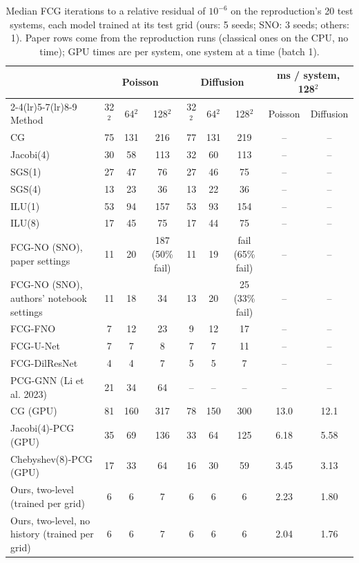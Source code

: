 \begin{table}[t]
\centering
\footnotesize
\caption{Median FCG iterations to a relative residual of $10^{-6}$ on the reproduction's 20 test systems, each model trained at its test grid (ours: 5 seeds; SNO: 3 seeds; others: 1). Paper rows come from the reproduction runs (classical ones on the CPU, no time); GPU times are per system, one system at a time (batch 1).}
\label{tab:unified}
\begin{tabular}{lcccccccc}
\toprule
& \multicolumn{3}{c}{Poisson} & \multicolumn{3}{c}{Diffusion} & \multicolumn{2}{c}{ms / system, 128$^2$} \\
\cmidrule(lr){2-4}\cmidrule(lr){5-7}\cmidrule(lr){8-9}
Method & 32$^2$ & 64$^2$ & 128$^2$ & 32$^2$ & 64$^2$ & 128$^2$ & Poisson & Diffusion \\
\midrule
CG & 75 & 131 & 216 & 77 & 131 & 219 & -- & -- \\
Jacobi(4) & 30 & 58 & 113 & 32 & 60 & 113 & -- & -- \\
SGS(1) & 27 & 47 & 76 & 27 & 46 & 75 & -- & -- \\
SGS(4) & 13 & 23 & 36 & 13 & 22 & 36 & -- & -- \\
ILU(1) & 53 & 94 & 157 & 53 & 93 & 154 & -- & -- \\
ILU(8) & 17 & 45 & 75 & 17 & 44 & 75 & -- & -- \\
FCG-NO (SNO), paper settings & 11 & 20 & 187 (50\% fail) & 11 & 19 & fail (65\% fail) & -- & -- \\
FCG-NO (SNO), authors' notebook settings & 11 & 18 & 34 & 13 & 20 & 25 (33\% fail) & -- & -- \\
FCG-FNO & 7 & 12 & 23 & 9 & 12 & 17 & -- & -- \\
FCG-U-Net & 7 & 7 & 8 & 7 & 7 & 11 & -- & -- \\
FCG-DilResNet & 4 & 4 & 7 & 5 & 5 & 7 & -- & -- \\
PCG-GNN (Li et al. 2023) & 21 & 34 & 64 & -- & -- & -- & -- & -- \\
CG (GPU) & 81 & 160 & 317 & 78 & 150 & 300 & 13.0 & 12.1 \\
Jacobi(4)-PCG (GPU) & 35 & 69 & 136 & 33 & 64 & 125 & 6.18 & 5.58 \\
Chebyshev(8)-PCG (GPU) & 17 & 33 & 64 & 16 & 30 & 59 & 3.45 & 3.13 \\
Ours, two-level (trained per grid) & 6 & 6 & 7 & 6 & 6 & 6 & 2.23 & 1.80 \\
Ours, two-level, no history (trained per grid) & 6 & 6 & 7 & 6 & 6 & 6 & 2.04 & 1.76 \\
\bottomrule
\end{tabular}
\end{table}
